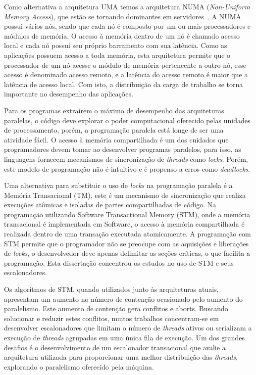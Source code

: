 \documentclass[diss,capa]{texufpel}
\begin{document}
Como alternativa a arquitetura UMA temos a arquitetura NUMA (\emph{Non-Uniform Memory Access}), que estão se tornando dominantes em servidores~\cite{Calciu:2017}. A NUMA possui vários nós, sendo que cada nó é composto por um ou mais processadores e módulos de memória. O acesso à memória dentro de um nó é chamado acesso local e cada nó possui seu próprio barramento com sua latência. Como as aplicações possuem acesso a toda memória, esta arquitetura permite que o processador de um nó acesse o módulo de memória pertencente a outro nó, esse acesso é denominado acesso remoto, e a latência do acesso remoto é maior que a latência de acesso local. Com isto, a distribuição da carga de trabalho se torna importante no desempenho das aplicações.

Para os programas extraírem o máximo de desempenho das arquiteturas paralelas, o código deve explorar o poder computacional oferecido pelas unidades de processamento, porém, a programação paralela está longe de ser uma atividade fácil. O acesso à memória compartilhada é um dos cuidados que programadores devem tomar ao desenvolver programas paralelos, para isso, as linguagens fornecem mecanismos de sincronização de \emph{threads} como \emph{locks}. Porém, este modelo de programação não é intuitivo e é propenso a erros como \emph{deadlocks}.

Uma alternativa para substituir o uso de \emph{locks} na programação paralela é a Memória Transacional (TM), este é um mecanismo de sincronização que realiza execuções atômicas e isoladas de partes compartilhadas de código. Na programação utilizando Software Transactional Memory (STM), onde a memória transacional é implementada em Software, o acesso à memória compartilhada é realizada dentro de uma transação executada atomicamente. A programação com STM permite que o programador não se preocupe com as aquisições e liberações de \emph{locks}, o desenvolvedor deve apenas delimitar as seções críticas, o que facilita a programação. Esta dissertação concentrou os estudos no uso de STM e seus escalonadores.

Os algoritmos de STM, quando utilizados junto às arquiteturas atuais, apresentam um aumento no número de contenção ocasionado pelo aumento do paralelismo. Este aumento de contenção gera conflitos e aborts. Buscando solucionar e reduzir estes conflitos, muitos trabalhos concentram-se em desenvolver escalonadores que limitam o número de \emph{threads} ativos ou serializam a execução de \emph{threads} agrupadas em uma única fila de execução. Um dos grandes desafios é o desenvolvimento de um escalonador transacional que avalie a arquitetura utilizada para proporcionar uma melhor distribuição das \emph{threads}, explorando o paralelismo oferecido pela máquina.
\end{document}
